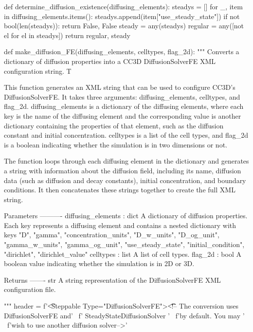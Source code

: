 \begin{python}
 def determine_diffusion_existence(diffusing_elements):
    steadys = []
    for _, item in diffusing_elements.items():
        steadys.append(item["use_steady_state"])
    if not bool(len(steadys)):
        return False, False
    steady = any(steadys)
    regular = any([not el for el in steadys])
    return regular, steady   
\end{python}

\begin{python}
def make_diffusion_FE(diffusing_elements, celltypes, flag_2d):
    """
    Converts a dictionary of diffusion properties into a CC3D DiffusionSolverFE XML configuration string. T

    This function generates an XML string that can be used to configure CC3D's DiffusionSolverFE. It takes three
    arguments: diffusing_elements, celltypes, and flag_2d. diffusing_elements is a dictionary of the diffusing
    elements, where each key is the name of the diffusing element and the corresponding value is another dictionary
    containing the properties of that element, such as the diffusion constant and initial concentration. celltypes is a
    list of the cell types, and flag_2d is a boolean indicating whether the simulation is in two dimensions or not.

    The function loops through each diffusing element in the dictionary and generates a string with information about
    the diffusion field, including its name, diffusion data (such as diffusion and decay constants), initial
    concentration, and boundary conditions. It then concatenates these strings together to create the full XML string.

    Parameters
    ----------
    diffusing_elements : dict
        A dictionary of diffusion properties. Each key represents a diffusing element and contains a nested dictionary
        with keys "D", "gamma", "concentration_units", "D_w_units", "D_og_unit", "gamma_w_units", "gamma_og_unit",
        "use_steady_state", "initial_condition", "dirichlet", "dirichlet_value"
    celltypes : list
        A list of cell types.
    flag_2d : bool
        A boolean value indicating whether the simulation is in 2D or 3D.

    Returns
    -------
    str
        A string representation of the DiffusionSolverFE XML configuration file.

    """
    header = f'\n\n\t<Steppable Type="DiffusionSolverFE">\n\t\t<!-- The conversion uses DiffusionSolverFE and' \
             f' SteadyStateDiffusionSolver ' \
             f'by default. You may ' \
             f'wish to use another diffusion solver-->\n'


\end{python}
